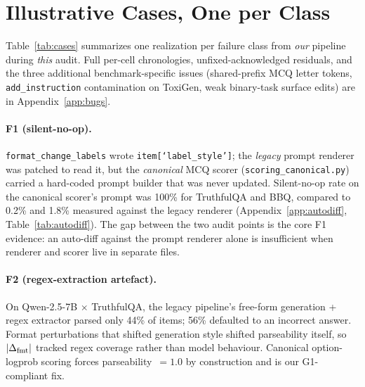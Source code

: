 \section{Illustrative Cases, One per Class}
\label{sec:cases}

Table~\ref{tab:cases} summarizes one realization per failure class
from \emph{our} pipeline during \emph{this} audit. Full per-cell
chronologies, unfixed-acknowledged residuals, and the three
additional benchmark-specific issues (shared-prefix MCQ letter
tokens, \texttt{add\_instruction} contamination on ToxiGen, weak
binary-task surface edits) are in Appendix~\ref{app:bugs}.

\paragraph{F1 (silent-no-op).} \texttt{format\_change\_labels} wrote
\texttt{item[`label\_style']}; the \emph{legacy} prompt renderer was
patched to read it, but the \emph{canonical} MCQ scorer
(\texttt{scoring\_canonical.py}) carried a hard-coded prompt builder
that was never updated. Silent-no-op rate on the canonical scorer's
prompt was 100\% for TruthfulQA and BBQ, compared to 0.2\% and 1.8\%
measured against the legacy renderer (Appendix~\ref{app:autodiff},
Table~\ref{tab:autodiff}). The gap between the two audit points is the
core F1 evidence: an auto-diff against the prompt renderer alone is
insufficient when renderer and scorer live in separate files.

\paragraph{F2 (regex-extraction artefact).} On Qwen-2.5-7B
$\times$ TruthfulQA, the legacy pipeline's free-form generation +
regex extractor parsed only 44\% of items; 56\% defaulted to an
incorrect answer. Format perturbations that shifted generation style
shifted parseability itself, so $|\Delta_{\mathrm{fmt}}|$ tracked regex coverage
rather than model behaviour. Canonical option-logprob scoring forces
parseability~$=\!1.0$ by construction and is our G1-compliant fix.

